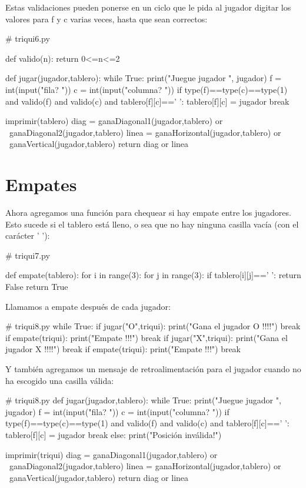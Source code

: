 Estas validaciones pueden ponerse en un ciclo que le pida al jugador
digitar los valores para f y c varias veces, hasta que sean correctos:

\begin{pythoncode}
# triqui6.py

def valido(n):
    return 0<=n<=2
    
def jugar(jugador,tablero):
    while True:     
        print("Juegue jugador ", jugador)
        f = int(input("fila? "))
        c = int(input("columna? "))
        if type(f)==type(c)==type(1) and valido(f) 
           and valido(c) and tablero[f][c]==' ':
            tablero[f][c] = jugador
            break      

    imprimir(tablero)
    diag = ganaDiagonal1(jugador,tablero) or \
           ganaDiagonal2(jugador,tablero)
    linea = ganaHorizontal(jugador,tablero) or \
            ganaVertical(jugador,tablero)
    return  diag or linea
\end{pythoncode}

\section{Empates}

Ahora agregamos una función para chequear si hay empate entre los
jugadores. Esto sucede si el tablero está lleno, o sea que no hay
ninguna casilla vacía (con el carácter ' '):

\begin{pythoncode}
# triqui7.py

def empate(tablero):
    for i in range(3):
        for j in range(3):
            if tablero[i][j]==' ':
                return False
    return True
\end{pythoncode}

Llamamos a empate después de cada jugador: 

\begin{pythoncode}
# triqui8.py
while True:
    if jugar("O",triqui):
        print("Gana el jugador O !!!!")
        break
    if empate(triqui):
        print("Empate !!!")
        break
    if jugar("X",triqui):
        print("Gana el jugador X !!!!")
        break
    if empate(triqui):
        print("Empate !!!")
        break
\end{pythoncode}

Y también agregamos un mensaje de retroalimentación para el jugador
cuando no ha escogido una casilla válida:

\begin{pythoncode}
# triqui8.py
def jugar(jugador,tablero):
    while True:     
        print("Juegue jugador ", jugador)
        f = int(input("fila? "))
        c = int(input("columna? "))
        if type(f)==type(c)==type(1) and valido(f) 
           and valido(c) and tablero[f][c]==' ':
            tablero[f][c] = jugador
            break
        else:
            print("Posición inválida!")

    imprimir(triqui)
    diag = ganaDiagonal1(jugador,tablero) or \
           ganaDiagonal2(jugador,tablero)
    linea = ganaHorizontal(jugador,tablero) or \
            ganaVertical(jugador,tablero)
    return  diag or linea
\end{pythoncode}

